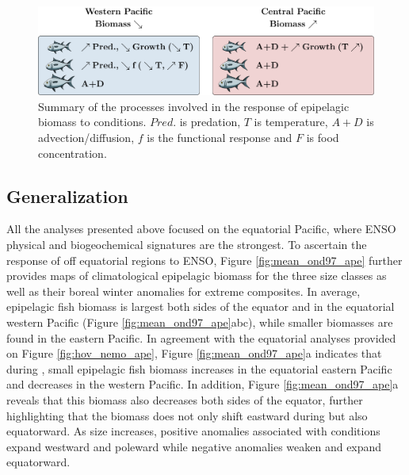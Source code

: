 \begin{figure}[h!tp]
	\centering
        \includegraphics[scale=0.6]{figs/conclusion/conlusion_fig.pdf}	
        \caption{Summary of the processes involved in the response of epipelagic biomass to \nino{} conditions.  $Pred.$ is predation, $T$ is temperature, $A+D$ is advection/diffusion, $f$ is the functional response and $F$ is food concentration.}
	\label{fig:proc_summary}
\end{figure}



\subsection{Generalization}

All the analyses presented above focused on the equatorial Pacific, where ENSO physical and biogeochemical signatures are the strongest. To ascertain the response of off equatorial regions to ENSO,  Figure \ref{fig:mean_ond97_ape} further provides maps of climatological epipelagic biomass for the three size classes as well as their boreal winter anomalies for extreme \nino{} composites.  In average, epipelagic fish biomass is largest both sides of the equator and in the equatorial western Pacific (Figure \ref{fig:mean_ond97_ape}abc), while smaller biomasses  are found in the eastern Pacific. In agreement with the equatorial analyses provided on Figure \ref{fig:hov_nemo_ape}, Figure \ref{fig:mean_ond97_ape}a indicates that during \nino{}, small epipelagic fish biomass increases in the equatorial eastern Pacific and decreases in the western Pacific. In addition, Figure \ref{fig:mean_ond97_ape}a reveals that this biomass also decreases both sides of the equator, further highlighting that the biomass does not only shift eastward during \nino{} but also equatorward.
As size increases, positive anomalies associated with \nino{} conditions expand westward and poleward while negative anomalies weaken and expand equatorward. 

